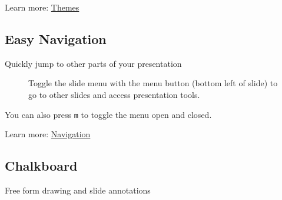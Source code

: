 \documentclass[
  letterpaper,
  DIV=11,
  numbers=noendperiod]{scrartcl}
\begin{document}
Learn more:
\href{https://quarto.org/docs/presentations/revealjs/themes.html}{Themes}

\hypertarget{easy-navigation}{%
\subsection{Easy Navigation}\label{easy-navigation}}

Quickly jump to other parts of your presentation

\begin{figure}

\begin{minipage}[t]{0.05\linewidth}

{\centering 


}

\end{minipage}%
%
\begin{minipage}[t]{0.95\linewidth}

{\centering 

Toggle the slide menu with the menu button (bottom left of slide) to go
to other slides and access presentation tools.

}

\end{minipage}%

\end{figure}

You can also press \texttt{m} to toggle the menu open and closed.

Learn more:
\href{https://quarto.org/docs/presentations/revealjs/presenting.html\#navigation-menu}{Navigation}

\hypertarget{chalkboard}{%
\subsection{Chalkboard}\label{chalkboard}}

Free form drawing and slide annotations
\end{document}
